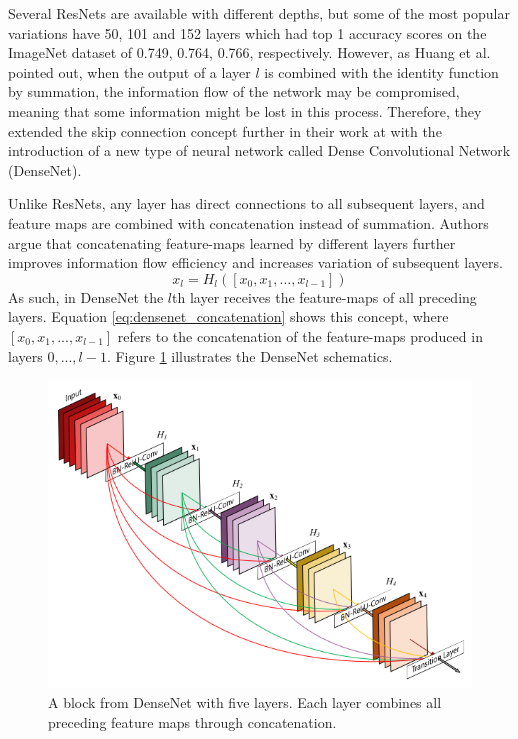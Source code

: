     Several ResNets are available with different depths, but some of the most popular variations have 50, 101 and 152 layers which had top 1 accuracy scores on the ImageNet dataset of 0.749, 0.764, 0.766, respectively. 
    However, as Huang et al. pointed out, when the output of a layer $l$ is combined with the identity function by summation, the information flow of the network may be compromised, meaning that some information might be lost in this process. Therefore, they extended the skip connection concept further in their work at \cite{densenet} with the introduction of a new type of neural network called Dense Convolutional Network (DenseNet). \par
    Unlike ResNets, any layer has direct connections to all subsequent layers, and feature maps are combined with concatenation instead of summation. Authors argue that concatenating feature-maps learned by different layers further improves information flow efficiency and increases variation of subsequent layers.
    \begin{equation}
        x_l = H_l([x_0, x_1, . . . , x_{l-1}])
        \label{eq:densenet_concatenation}
    \end{equation}
    As such, in DenseNet the $l$th layer receives the feature-maps of all preceding layers. Equation \ref{eq:densenet_concatenation} shows this concept, where $ [x_0, x_1, . . . , x_{l-1}] $ refers to the concatenation of the feature-maps produced in layers $ 0, . . . , l-1 $.  Figure \ref{fig:densenet} illustrates the DenseNet schematics.
    
    \begin{figure}[ht]
      \centering
        \includegraphics[width=0.7\linewidth]{figs/densenet.png}
      \caption{A block from DenseNet with five layers. Each layer combines all preceding feature maps through concatenation. \cite{densenet}}
      \label{fig:densenet}
    \end{figure}
    

